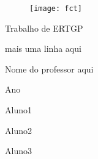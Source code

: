 \documentclass[12pt]{article}
\begin{document}
	\begin{figure}[htbp]
		\centering
		\texttt{[image: fct]}
	\end{figure}
	
	\vspace{20mm}
	
	\begin{center}
		{\huge Trabalho de ERTGP}
	\end{center}
	\begin{center}
		{\huge mais uma linha aqui}
	\end{center}
	\vspace{20mm}
	\begin{center}
		{\large Nome do professor aqui}
		
		{\large Ano}
	\end{center}
	\vspace{70mm}
	\begin{flushright}
	Aluno1
	
	Aluno2
	
	Aluno3
	\end{flushright}
\end{document}
